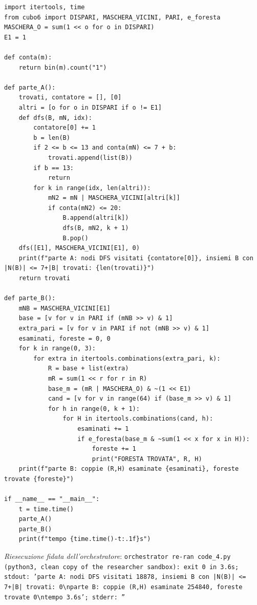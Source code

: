 \documentclass[11pt,a4paper]{article}
\begin{document}
\begin{lstlisting}[caption={attempt\_001 code\_4 [python, rigore exact] — Computations 1a/1b (mixed parity classes): part A enumerates all B ⊆ O with 100000 ∈ B and — approvato dal Referee}]
import itertools, time
from cubo6 import DISPARI, MASCHERA_VICINI, PARI, e_foresta
MASCHERA_O = sum(1 << o for o in DISPARI)
E1 = 1

def conta(m):
    return bin(m).count("1")

def parte_A():
    trovati, contatore = [], [0]
    altri = [o for o in DISPARI if o != E1]
    def dfs(B, mN, idx):
        contatore[0] += 1
        b = len(B)
        if 2 <= b <= 13 and conta(mN) <= 7 + b:
            trovati.append(list(B))
        if b == 13:
            return
        for k in range(idx, len(altri)):
            mN2 = mN | MASCHERA_VICINI[altri[k]]
            if conta(mN2) <= 20:
                B.append(altri[k])
                dfs(B, mN2, k + 1)
                B.pop()
    dfs([E1], MASCHERA_VICINI[E1], 0)
    print(f"parte A: nodi DFS visitati {contatore[0]}, insiemi B con |N(B)| <= 7+|B| trovati: {len(trovati)}")
    return trovati

def parte_B():
    mNB = MASCHERA_VICINI[E1]
    base = [v for v in PARI if (mNB >> v) & 1]
    extra_pari = [v for v in PARI if not (mNB >> v) & 1]
    esaminati, foreste = 0, 0
    for k in range(0, 3):
        for extra in itertools.combinations(extra_pari, k):
            R = base + list(extra)
            mR = sum(1 << r for r in R)
            base_m = (mR | MASCHERA_O) & ~(1 << E1)
            cand = [v for v in range(64) if (base_m >> v) & 1]
            for h in range(0, k + 1):
                for H in itertools.combinations(cand, h):
                    esaminati += 1
                    if e_foresta(base_m & ~sum(1 << x for x in H)):
                        foreste += 1
                        print("FORESTA TROVATA", R, H)
    print(f"parte B: coppie (R,H) esaminate {esaminati}, foreste trovate {foreste}")

if __name__ == "__main__":
    t = time.time()
    parte_A()
    parte_B()
    print(f"tempo {time.time()-t:.1f}s")

\end{lstlisting}
\noindent\emph{Riesecuzione fidata dell'orchestratore}: \texttt{orchestrator re-ran code\_4.py (python3, clean copy of the researcher sandbox): exit 0 in 3.6s; stdout: 'parte A: nodi DFS visitati 18878, insiemi B con |N(B)| \textless{}= 7+|B| trovati: 0\textbackslash{}nparte B: coppie (R,H) esaminate 254840, foreste trovate 0\textbackslash{}ntempo 3.6s'; stderr: ''}
\end{document}
